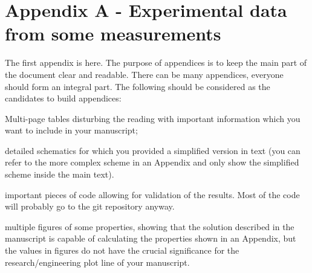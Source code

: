 \cleardoublepage%
%
\chapter[Appendix A - Experimental data from some measurements]{\label{chap:apx_exp_data}Appendix A - Experimental data\\from some measurements}%
%
  
The first appendix is here. The purpose of appendices is to keep the main part of the document clear and readable. There can be many appendices, everyone should form an integral part. The following should be considered as the candidates to build appendices:

\begin{tight_itemize}
    \item Multi-page tables disturbing the reading with important information which you want to include in your manuscript;
    \item detailed schematics for which you provided a simplified version in text (you can refer to the more complex scheme in an Appendix and only show the simplified scheme inside the main text).
    \item important pieces of code allowing for validation of the results. Most of the code will probably go to the git repository anyway.
    \item multiple figures of some properties, showing that the solution described in the manuscript is capable of calculating the properties shown in an Appendix, but the values in figures do not have the crucial significance for the research/engineering plot line of your manuscript.
\end{tight_itemize}